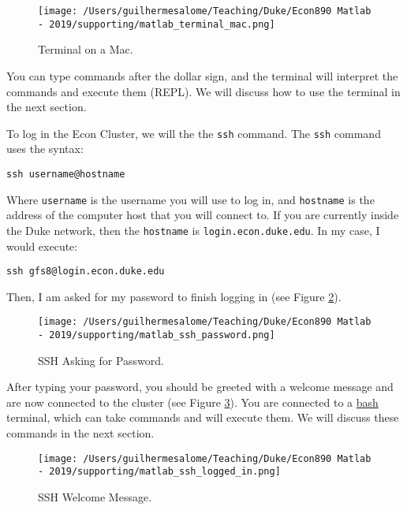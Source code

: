 \documentclass[12pt, a4paper]{article}
\begin{document}
\begin{figure}[H]
\centering
\texttt{[image: /Users/guilhermesalome/Teaching/Duke/Econ890 Matlab - 2019/supporting/matlab\_terminal\_mac.png]}
\caption{\label{fig:org0e48c20}
Terminal on a Mac.}
\end{figure}

You can type commands after the dollar sign, and the terminal will interpret the commands and execute them (REPL).
We will discuss how to use the terminal in the next section.

To log in the Econ Cluster, we will the the \texttt{ssh} command.
The \texttt{ssh} command uses the syntax:
\lstset{language=bash,label= ,caption= ,captionpos=b,firstnumber=1,numbers=left,style=bash}
\begin{lstlisting}
ssh username@hostname
\end{lstlisting}
Where \texttt{username} is the username you will use to log in, and \texttt{hostname} is the address of the computer host that you will connect to.
If you are currently inside the Duke network, then the \texttt{hostname} is \texttt{login.econ.duke.edu}.
In my case, I would execute:
\lstset{language=bash,label= ,caption= ,captionpos=b,firstnumber=1,numbers=left,style=bash}
\begin{lstlisting}
ssh gfs8@login.econ.duke.edu
\end{lstlisting}
Then, I am asked for my password to finish logging in (see Figure \ref{fig:orgfbdea8d}).

\begin{figure}[H]
\centering
\texttt{[image: /Users/guilhermesalome/Teaching/Duke/Econ890 Matlab - 2019/supporting/matlab\_ssh\_password.png]}
\caption{\label{fig:orgfbdea8d}
SSH Asking for Password.}
\end{figure}

After typing your password, you should be greeted with a welcome message and are now connected to the cluster (see Figure \ref{fig:orgd27beb3}).
You are connected to a \href{https://en.wikipedia.org/wiki/Bash\_(Unix\_shell)}{bash} terminal, which can take commands and will execute them.
We will discuss these commands in the next section.

\begin{figure}[H]
\centering
\texttt{[image: /Users/guilhermesalome/Teaching/Duke/Econ890 Matlab - 2019/supporting/matlab\_ssh\_logged\_in.png]}
\caption{\label{fig:orgd27beb3}
SSH Welcome Message.}
\end{figure}
\end{document}
